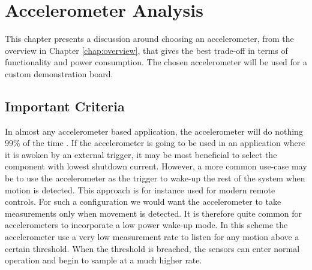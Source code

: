 \chapter{Accelerometer Analysis}

This chapter presents a discussion around choosing an accelerometer, from the overview in Chapter \ref{chap:overview}, that gives the best trade-off in terms of functionality and power consumption. The chosen accelerometer will be used for a custom demonstration board.

\section{Important Criteria}

In almost any accelerometer based application, the accelerometer will do nothing 99\% of the time \cite{moldsvor15}. If the accelerometer is going to be used in an application where it is awoken by an external trigger, it may be most beneficial to select the component with lowest shutdown current. However, a more common use-case may be to use the accelerometer as the trigger to wake-up the rest of the system when motion is detected. This approach is for instance used for modern remote controls. For such a configuration we would want the accelerometer to take measurements only when movement is detected. It is therefore quite common for accelerometers to incorporate a low power wake-up mode. In this scheme the accelerometer use a very low measurement rate to listen for any motion above a certain threshold. When the threshold is breached, the sensors can enter normal operation and begin to sample at a much higher rate. 

